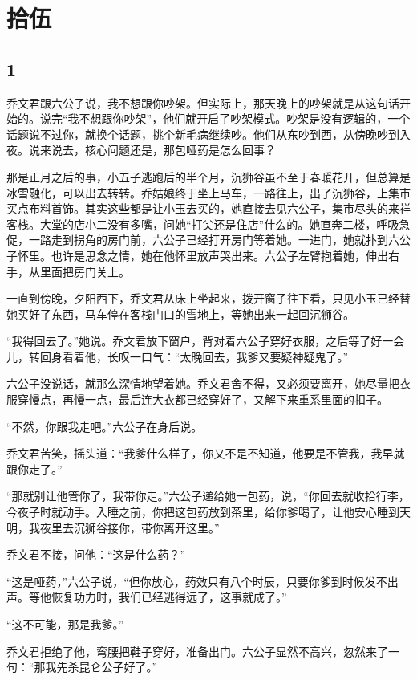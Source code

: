 \section{拾伍}

{\centering\subsection{1}}

乔文君跟六公子说，我不想跟你吵架。但实际上，那天晚上的吵架就是从这句话开始的。说完“我不想跟你吵架”，他们就开启了吵架模式。吵架是没有逻辑的，一个话题说不过你，就换个话题，挑个新毛病继续吵。他们从东吵到西，从傍晚吵到入夜。说来说去，核心问题还是，那包哑药是怎么回事？

那是正月之后的事，小五子逃跑后的半个月，沉狮谷虽不至于春暖花开，但总算是冰雪融化，可以出去转转。乔姑娘终于坐上马车，一路往上，出了沉狮谷，上集市买点布料首饰。其实这些都是让小玉去买的，她直接去见六公子，集市尽头的来祥客栈。大堂的店小二没有多嘴，问她“打尖还是住店”什么的。她直奔二楼，呼吸急促，一路走到拐角的房门前，六公子已经打开房门等着她。一进门，她就扑到六公子怀里。也许是思念之情，她在他怀里放声哭出来。六公子左臂抱着她，伸出右手，从里面把房门关上。

一直到傍晚，夕阳西下，乔文君从床上坐起来，拨开窗子往下看，只见小玉已经替她买好了东西，马车停在客栈门口的雪地上，等她出来一起回沉狮谷。

“我得回去了。”她说。乔文君放下窗户，背对着六公子穿好衣服，之后等了好一会儿，转回身看着他，长叹一口气：“太晚回去，我爹又要疑神疑鬼了。”

六公子没说话，就那么深情地望着她。乔文君舍不得，又必须要离开，她尽量把衣服穿慢点，再慢一点，最后连大衣都已经穿好了，又解下来重系里面的扣子。

“不然，你跟我走吧。”六公子在身后说。

乔文君苦笑，摇头道：“我爹什么样子，你又不是不知道，他要是不管我，我早就跟你走了。”

“那就别让他管你了，我带你走。”六公子递给她一包药，说，“你回去就收拾行李，今夜子时就动手。入睡之前，你把这包药放到茶里，给你爹喝了，让他安心睡到天明，我夜里去沉狮谷接你，带你离开这里。”

乔文君不接，问他：“这是什么药？”

“这是哑药，”六公子说，“但你放心，药效只有八个时辰，只要你爹到时候发不出声。等他恢复功力时，我们已经逃得远了，这事就成了。”

“这不可能，那是我爹。”

乔文君拒绝了他，弯腰把鞋子穿好，准备出门。六公子显然不高兴，忽然来了一句：“那我先杀昆仑公子好了。”

